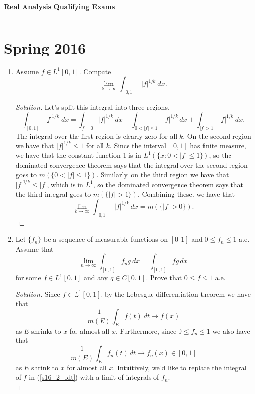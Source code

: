 \documentclass[11pt,letterpaper]{report}
\newenvironment{solution}
{\begin{proof}[Solution]}
{\end{proof}}
\begin{document}
\begin{center}
{\bf \Large Real Analysis Qualifying Exams} %
\vspace{0.2cm}
\hrule
\end{center}

\section{Spring 2016}
\begin{enumerate}
	\item Assume $f\in L^1[0,1]$. Compute
	\[
	\lim_{k\to \infty}\int_{[0,1]}|f|^{1/k}\ dx.
	\]
	\begin{solution}
		Let's split this integral into three regions.
		\[
		\int_{[0,1]}|f|^{1/k}\ dx = \int_{f=0}|f|^{1/k}\ dx + \int_{0<|f|\leq 1}|f|^{1/k}\ dx + \int_{|f|>1}|f|^{1/k}\ dx.
		\]
		The integral over the first region is clearly zero for all $k$. On the second region we have that $|f|^{1/k} \leq 1$ for all $k$. Since the interval $[0,1]$ has finite measure, we have that the constant function 1 is in $L^1(\{x: 0<|f|\leq 1\})$, so the dominated convergence theorem says that the integral over the second region goes to $m(\{0<|f|\leq 1\})$. Similarly, on the third region we have that $|f|^{1/k}\leq |f|$, which is in $L^1$, so the dominated convergence theorem says that the third integral goes to $m(\{|f|>1\})$. Combining these, we have that
		\[
		\lim_{k\to \infty}\int_{[0,1]}|f|^{1/k}\ dx = m(\{|f|>0\}).
		\]
	\end{solution}

	\item Let $\{f_n\}$ be a sequence of measurable functions on $[0,1]$ and $0\leq f_n\leq 1$ a.e. Assume that
	\[
	\lim_{n\to \infty}\int_{[0,1]}f_ng\ dx = \int_{[0,1]}fg\ dx
	\]
	for some $f\in L^1[0,1]$ and any $g\in C[0,1]$. Prove that $0\leq f\leq 1$ a.e.
	\begin{solution}
		Since $f\in L^1[0,1]$, by the Lebesgue differentiation theorem we have that
		\begin{equation}\label{s16_2_ldt}
		\frac{1}{m(E)}\int_Ef(t)\ dt \to f(x)
		\end{equation}
		as $E$ shrinks to $x$ for almost all $x$. Furthermore, since $0\leq f_n\leq 1$ we also have that
		\[
		\frac{1}{m(E)}\int_Ef_n(t)\ dt\to f_n(x)\in [0,1]
		\]
		as $E$ shrink to $x$ for almost all $x$.  Intuitively, we'd like to replace the integral of $f$ in (\ref{s16_2_ldt}) with a limit of integrals of $f_n$.\\


\end{solution}
\end{enumerate}
\end{document}

